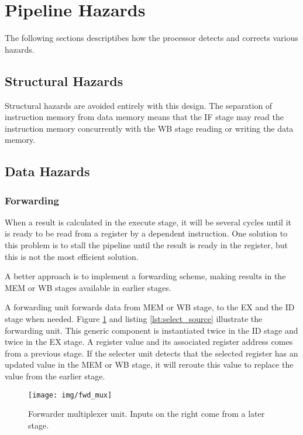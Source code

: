 \section{Pipeline Hazards}
The following sections descriptibes how the processor detects and corrects various hazards.

\subsection{Structural Hazards}
Structural hazards are avoided entirely with this design.
The separation of instruction memory from data memory means that the IF stage may read the instruction memory concurrently with the WB stage reading or writing the data memory.

\subsection{Data Hazards}
\subsubsection{Forwarding}
\label{sec:forwarding}
When a result is calculated in the execute stage,
it will be several cycles until it is ready to be read from a register by a dependent instruction.
One solution to this problem is to stall the pipeline until the result is ready in the register,
but this is not the most efficient solution.

A better approach is to implement a forwarding scheme,
making results in the MEM or WB stages available in earlier stages.

A forwarding unit forwards data from MEM or WB stage, to the EX and the ID stage when needed.
Figure \ref{fig:fwd_mux} and listing \ref{lst:select_source} illustrate the forwarding unit.
This generic component is instantiated twice in the ID stage and twice in the EX stage.
A register value and its associated register address comes from a previous stage.
If the selecter unit detects that the selected register has an updated value in the MEM or WB stage,
it will reroute this value to replace the value from the earlier stage.

\begin{figure}[h]
    \centering
    \texttt{[image: img/fwd\_mux]}
    \caption{Forwarder multiplexer unit. Inputs on the right come from a later stage.}
    \label{fig:fwd_mux}
\end{figure}


